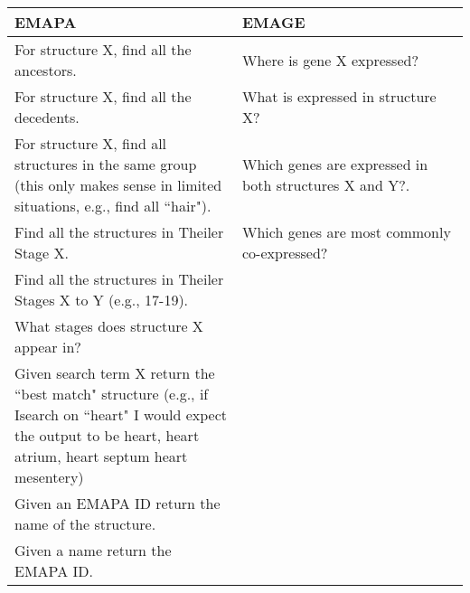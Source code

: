 \begin{center}
    \begin{tabular}{ | p{0.5\linewidth} | p{0.5\linewidth}|}
    \hline
    \textbf{EMAPA} & \textbf{EMAGE} \\ \hline
    For structure X, find all the ancestors. &  Where is gene X expressed? \\ \hline
    For structure X, find all the decedents. &  What is expressed in structure X? \\ \hline
    For structure X, find all structures in the same group (this only makes sense in limited situations, e.g., find all ``hair"). & Which genes are expressed in both structures X and Y?. \\ \hline
    Find all the structures in Theiler Stage X. & Which genes are most commonly co-expressed? \\ \hline
    Find all the structures in Theiler Stages X to Y (e.g., 17-19). &  \\ \hline
    What stages does structure X appear in? & \\ \hline
    Given search term X return the ``best match" structure (e.g., if Isearch on ``heart" I would expect the output to be heart, heart atrium, heart septum  heart mesentery) & \\ \hline
    Given an EMAPA ID return the name of the structure. &  \\ \hline
    Given a name return the EMAPA ID. &  \\ \hline
    \end{tabular}
\end{center}
\parindent 15pt






